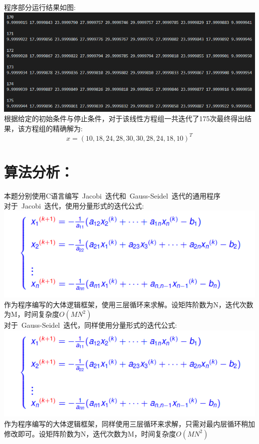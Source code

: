 \documentclass{article}
\begin{document}
	程序部分运行结果如图:\\
	\includegraphics*[scale = 0.5]{3.png}\\
	根据给定的初始条件与停止条件，对于该线性方程组一共迭代了175次最终得出结果，该方程组的精确解为:\\
	$$x=(10,18,24,28,30,30,28,24,18,10)^{T}$$
	\section{算法分析：}
	本题分别使用C语言编写\ Jacobi\ 迭代和\ Gauss-Seidel\ 迭代的通用程序\\
	对于\ Jacobi\ 迭代，使用分量形式的迭代公式:\\
	\includegraphics*[scale = 0.5]{4.png}\\
	作为程序编写的大体逻辑框架，使用三层循环来求解。设矩阵阶数为N，迭代次数为M，时间复杂度$O(MN^{2})$\\
	对于\ Gauss-Seidel\ 迭代，同样使用分量形式的迭代公式:\\
	\includegraphics*[scale = 0.6]{4.png}\\
	作为程序编写的大体逻辑框架，同样使用三层循环来求解，只需对最内层循环稍加修改即可。设矩阵阶数为N，迭代次数为M，时间复杂度$O(MN^{2})$\\
\end{document}
